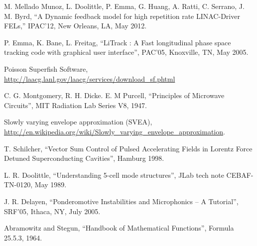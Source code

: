 \documentclass[a4paper,12pt]{article}
\begin{document}
\newpage

\begin{thebibliography}{19}   %

M. Mellado Munoz, L. Doolittle, P. Emma, G. Huang, A. Ratti, C. Serrano, J. M. Byrd, ``A Dynamic feedback model for high repetition rate LINAC-Driver FELs,''
IPAC'12, New Orleans, LA, May 2012.

P. Emma, K. Bane, L. Freitag, ``LiTrack : A Fast longitudinal phase space tracking code with graphical user interface'', PAC'05,  Knoxville, TN, May 2005.

Poisson Superfish Software, \url{http://laacg.lanl.gov/laacg/services/download_sf.phtml}

C. G. Montgomery, R. H. Dicke. E. M Purcell, ``Principles of Microwave Circuits'', MIT Radiation Lab Series V8, 1947.

Slowly varying envelope approximation (SVEA), \url{http://en.wikipedia.org/wiki/Slowly_varying_envelope_approximation}.

T. Schilcher, ``Vector Sum Control of Pulsed Accelerating Fields in Lorentz Force Detuned Superconducting Cavities'', Hamburg 1998.

L. R. Doolittle, ``Understanding 5-cell mode structures'', JLab tech note CEBAF-TN-0120, May 1989.

J. R. Delayen, ``Ponderomotive Instabilities and Microphonics -- A Tutorial'', SRF'05, Ithaca, NY, July 2005.

Abramowitz and Stegun, ``Handbook of Mathematical Functions'', Formula 25.5.3, 1964.


\end{thebibliography}
\end{document}
